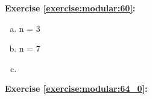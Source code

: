 \noindent\textbf{Exercise \ref{exercise:modular:60}:}
\begin{enumerate}[(a)]
\item
n = 3

\item
n = 7

\item
\end{enumerate}


\noindent\textbf{Exercise \ref{exercise:modular:64_0}:}

